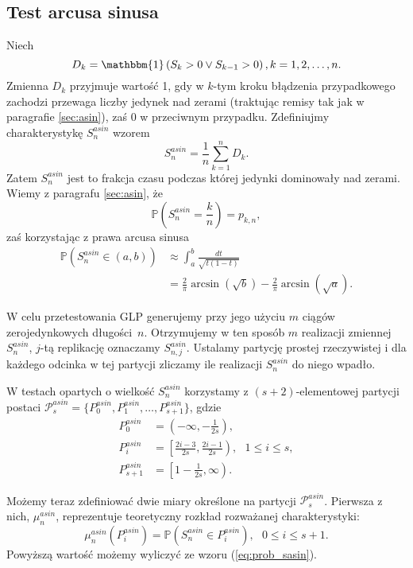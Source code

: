\documentclass[a4paper,11pt,twoside]{book}
\newcommand{\Pro}[1]{\mathbb{P}\left(#1\right)}
\newcommand{\Sasin}[1]{S^{asin}_#1}
\theoremstyle{definition}
\begin{document}
\subsection{Test arcusa sinusa}
Niech
\begin{equation}
D_k = \mathbbm{1}\left(S_k > 0 \vee S_{k-1}>0 \right), k=1,2,\ldots,n.
\end{equation}
Zmienna $D_k$ przyjmuje wartość 1, gdy w $k$-tym kroku błądzenia przypadkowego zachodzi przewaga liczby jedynek nad zerami (traktując remisy tak jak w paragrafie \ref{sec:asin}), zaś 0 w przeciwnym przypadku. Zdefiniujmy charakterystykę $\Sasin{n}$ wzorem
\begin{equation}
 \Sasin{n} = \frac{1}{n} \sum_{k=1}^n D_k.
\end{equation}
Zatem $\Sasin{n}$ jest to frakcja czasu podczas której jedynki dominowały nad zerami. Wiemy z paragrafu \ref{sec:asin}, że
\[ \Pro{\Sasin{n} = \frac{k}{n}} = p_{k,n}, \]
zaś korzystając z prawa arcusa sinusa
\begin{equation}
\begin{split}
 \label{eq:prob_sasin}
  \Pro{\Sasin{n} \in (a,b)} &\approx \int_a^b \frac{dt}{\sqrt{t(1-t)}}\\
  &= \frac{2}{\pi}\arcsin(\sqrt{b}) - \frac{2}{\pi}\arcsin(\sqrt{a}).
\end{split}
\end{equation}

W celu przetestowania GLP generujemy przy jego użyciu $m$ ciągów zerojedynkowych długości~$n$. Otrzymujemy w ten sposób $m$ realizacji zmiennej $\Sasin{n}$, $j$-tą replikację oznaczamy $\Sasin{{n,j}}$. Ustalamy partycję prostej rzeczywistej i dla każdego odcinka w tej partycji zliczamy ile realizacji $\Sasin{n}$ do niego wpadło.

W testach opartych o wielkość $\Sasin{n}$ korzystamy z $(s+2)$-elementowej partycji postaci $\mathcal{P}^{asin}_s = \{ P^{asin}_0, P^{asin}_1, \ldots, P^{asin}_{s+1}\}$, gdzie
\begin{equation*}
\begin{split}
  P^{asin}_0 &= \left(-\infty, -\frac{1}{2s}\right),\\
  P^{asin}_i &= \left[\frac{2i-3}{2s}, \frac{2i-1}{2s} \right),\ \ \ 1 \leq i \leq s,\\
  P^{asin}_{s+1} &= \left[1- \frac{1}{2s}, \infty\right).
\end{split}
\end{equation*}

Możemy teraz zdefiniować dwie miary określone na partycji  $\mathcal{P}^{asin}_s$. Pierwsza z nich, $ \mu^{asin}_n$, reprezentuje teoretyczny rozkład rozważanej charakterystyki:
\begin{equation}
\label{eq:mu_asin}
 \mu^{asin}_n \left( P^{asin}_i \right) = \Pro{\Sasin{n} \in P^{asin}_i},\ \ \ 0 \leq i \leq s+1.
\end{equation}
Powyższą wartość możemy wyliczyć ze wzoru (\ref{eq:prob_sasin}).
\end{document}
